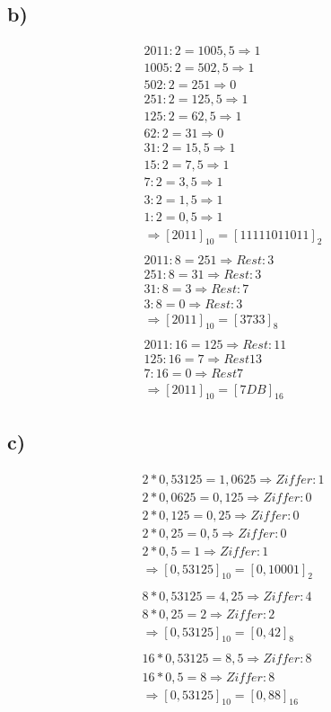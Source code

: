 \documentclass[12pt,a4paper]{article}
\begin{document}
\subsection*{b)}
\begin{align*}
2011 : 2 = 1005,5 \Rightarrow 1 \\
1005 : 2 = 502,5 \Rightarrow 1 \\
502 : 2 = 251 \Rightarrow 0 \\
251 : 2 = 125,5 \Rightarrow 1 \\
125 : 2 = 62,5 \Rightarrow 1 \\
62 : 2 = 31 \Rightarrow 0 \\
31 : 2 = 15,5 \Rightarrow 1 \\
15 : 2 = 7,5 \Rightarrow 1 \\
7 : 2 = 3,5 \Rightarrow 1 \\
3 : 2 = 1,5 \Rightarrow 1 \\
1 : 2 = 0,5 \Rightarrow 1 \\
\Rightarrow [2011]_{10} = [11111011011]_{2} \\
\\
2011 : 8 = 251 \Rightarrow Rest: 3 \\
251 : 8 = 31 \Rightarrow Rest: 3 \\
31 : 8 = 3 \Rightarrow Rest: 7 \\
3 : 8 = 0 \Rightarrow Rest: 3 \\
\Rightarrow [2011]_{10} = [3733]_{8} \\
\\
2011 : 16 = 125 \Rightarrow Rest: 11 \\
125 : 16 = 7 \Rightarrow Rest 13 \\
7 : 16 = 0 \Rightarrow Rest 7 \\
\Rightarrow [2011]_{10} = [7DB]_{16}
\end{align*}
\subsection*{c)}
\begin{align*}
2 * 0,53125 = 1,0625 \Rightarrow Ziffer: 1 \\
2 * 0,0625 = 0,125 \Rightarrow Ziffer: 0 \\
2 * 0,125 = 0,25 \Rightarrow Ziffer: 0 \\
2 * 0,25 = 0,5 \Rightarrow Ziffer: 0 \\
2 * 0,5 = 1 \Rightarrow Ziffer: 1 \\
\Rightarrow [0,53125]_{10} = [0,10001]_{2} \\
\\
8 * 0,53125 = 4,25 \Rightarrow Ziffer: 4 \\
8 * 0,25 = 2 \Rightarrow Ziffer: 2 \\
\Rightarrow [0,53125]_{10} = [0,42]_{8} \\
\\
16 * 0,53125 = 8,5 \Rightarrow Ziffer: 8 \\
16 * 0,5 = 8 \Rightarrow Ziffer: 8 \\
\Rightarrow [0,53125]_{10} = [0,88]_{16}
\end{align*}
\end{document}
